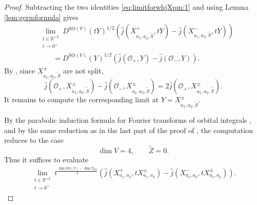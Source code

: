 \documentclass[12pt]{amsart}
\numberwithin{equation}{subsection}
\newcommand{\BR}{{\mathbb {R}}}
\newcommand{\CO}{{\mathcal {O}}}
\newcommand{\SO}{{\mathrm{SO}}}
\def\cpt{\mathrm{cpt}}
\def\SO{\mathrm{SO}}
\begin{document}
\begin{proof}
Subtracting the two identities \eqref{eq:limitforwhjXpm:1} and using Lemma
\ref{lem:germformula} gives
\begin{align*}
&\lim_{\substack{t\in \BR^{\times 2}\\ t\to 0^+}}
D^{\SO(V)}(tY)^{1/2}
\left(
\widehat{j}(X^+_{a_1,a_2,\widetilde S},tY)
-
\widehat{j}(X^-_{a_1,a_2,\widetilde S},tY)
\right)
\\
&\qquad =
D^{\SO(V)}(Y)^{1/2}
\left(
\widehat{j}(\CO_+,Y)-\widehat{j}(\CO_-,Y)
\right).
\end{align*}
By \cite[(3.4.6)]{beuzart2015local}, since
$X^\pm_{a_1,a_2,\widetilde S}$ are not split,
\[
\widehat{j}(\CO_+,X^\pm_{a_1,a_2,\widetilde S})
-
\widehat{j}(\CO_-,X^\pm_{a_1,a_2,\widetilde S})
=
2\widehat{j}(\CO_+,X^\pm_{a_1,a_2,\widetilde S}).
\]
It remains to compute the corresponding limit at
$Y=X^\pm_{a_1,a_2,\widetilde S}$.

By the parabolic induction formula for Fourier transforms of orbital integrals
\cite[(3.4.4)]{beuzart2015local}, and by the same reduction as in the last
part of the proof of \cite[Lem.~13.4]{waldspurger10}, the computation reduces
to the case
\[
\dim V=4,\qquad \widetilde Z=0.
\]
Thus it suffices to evaluate
\begin{align}\label{eq:lemmaformula:1}
\lim_{\substack{t\in \BR^{\times 2}\\ t\to 0^+}}
t^{\frac{\dim \SO(V)-\dim T_\cpt}{2}}
\left(
\widehat{j}(X^+_{a_1,a_2},tX^\pm_{a_1,a_2})
-
\widehat{j}(X^-_{a_1,a_2},tX^\pm_{a_1,a_2})
\right).
\end{align}


\end{proof}
\end{document}
